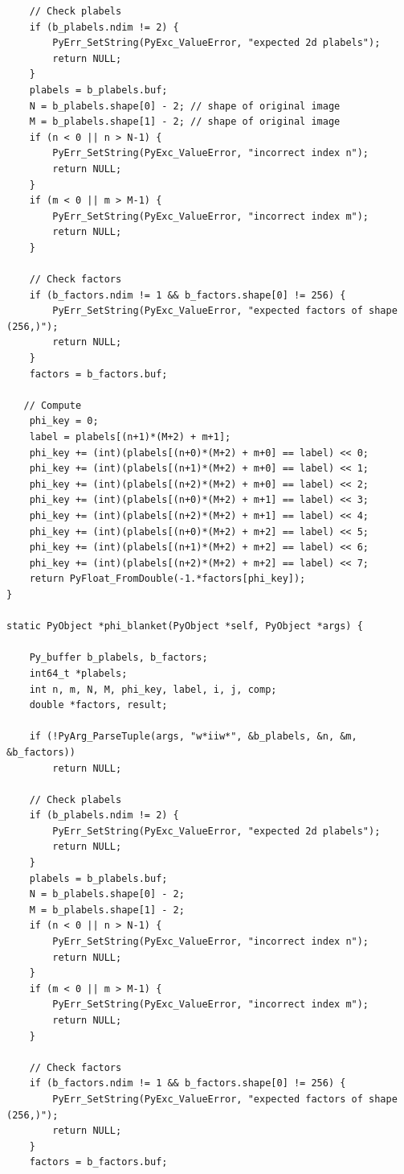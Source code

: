\documentclass[12pt]{article}
\begin{document}
\begin{verbatim}
    // Check plabels
    if (b_plabels.ndim != 2) {
        PyErr_SetString(PyExc_ValueError, "expected 2d plabels");
        return NULL;
    }
    plabels = b_plabels.buf;
    N = b_plabels.shape[0] - 2; // shape of original image
    M = b_plabels.shape[1] - 2; // shape of original image
    if (n < 0 || n > N-1) {
        PyErr_SetString(PyExc_ValueError, "incorrect index n");
        return NULL;
    }
    if (m < 0 || m > M-1) {
        PyErr_SetString(PyExc_ValueError, "incorrect index m");
        return NULL;
    }

    // Check factors
    if (b_factors.ndim != 1 && b_factors.shape[0] != 256) {
        PyErr_SetString(PyExc_ValueError, "expected factors of shape (256,)");
        return NULL;
    }
    factors = b_factors.buf;

   // Compute
    phi_key = 0;
    label = plabels[(n+1)*(M+2) + m+1];
    phi_key += (int)(plabels[(n+0)*(M+2) + m+0] == label) << 0;
    phi_key += (int)(plabels[(n+1)*(M+2) + m+0] == label) << 1;
    phi_key += (int)(plabels[(n+2)*(M+2) + m+0] == label) << 2;
    phi_key += (int)(plabels[(n+0)*(M+2) + m+1] == label) << 3;
    phi_key += (int)(plabels[(n+2)*(M+2) + m+1] == label) << 4;
    phi_key += (int)(plabels[(n+0)*(M+2) + m+2] == label) << 5;
    phi_key += (int)(plabels[(n+1)*(M+2) + m+2] == label) << 6;
    phi_key += (int)(plabels[(n+2)*(M+2) + m+2] == label) << 7;
    return PyFloat_FromDouble(-1.*factors[phi_key]);
}

static PyObject *phi_blanket(PyObject *self, PyObject *args) {

    Py_buffer b_plabels, b_factors;
    int64_t *plabels;
    int n, m, N, M, phi_key, label, i, j, comp;
    double *factors, result;

    if (!PyArg_ParseTuple(args, "w*iiw*", &b_plabels, &n, &m, &b_factors))
        return NULL;

    // Check plabels
    if (b_plabels.ndim != 2) {
        PyErr_SetString(PyExc_ValueError, "expected 2d plabels");
        return NULL;
    }
    plabels = b_plabels.buf;
    N = b_plabels.shape[0] - 2;
    M = b_plabels.shape[1] - 2;
    if (n < 0 || n > N-1) {
        PyErr_SetString(PyExc_ValueError, "incorrect index n");
        return NULL;
    }
    if (m < 0 || m > M-1) {
        PyErr_SetString(PyExc_ValueError, "incorrect index m");
        return NULL;
    }

    // Check factors
    if (b_factors.ndim != 1 && b_factors.shape[0] != 256) {
        PyErr_SetString(PyExc_ValueError, "expected factors of shape (256,)");
        return NULL;
    }
    factors = b_factors.buf;


\end{verbatim}
\end{document}
